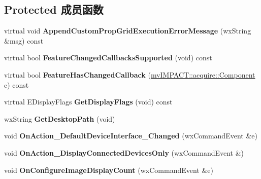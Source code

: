 \subsection*{Protected 成员函数}
\begin{DoxyCompactItemize}
\item 
\hypertarget{class_prop_view_frame_a87aa1f344d462e6770db16c2cde90939}{virtual void {\bfseries Append\+Custom\+Prop\+Grid\+Execution\+Error\+Message} (wx\+String \&msg) const }\label{class_prop_view_frame_a87aa1f344d462e6770db16c2cde90939}

\item 
\hypertarget{class_prop_view_frame_a57034c667d733512ce04baa935dfb9ba}{virtual bool {\bfseries Feature\+Changed\+Callbacks\+Supported} (void) const }\label{class_prop_view_frame_a57034c667d733512ce04baa935dfb9ba}

\item 
\hypertarget{class_prop_view_frame_a1a16a8fc6d2a0a8e7a744d9ebe54304b}{virtual bool {\bfseries Feature\+Has\+Changed\+Callback} (\hyperlink{classmv_i_m_p_a_c_t_1_1acquire_1_1_component}{mv\+I\+M\+P\+A\+C\+T\+::acquire\+::\+Component} c) const }\label{class_prop_view_frame_a1a16a8fc6d2a0a8e7a744d9ebe54304b}

\item 
\hypertarget{class_prop_view_frame_ac54e19c02e8c7582d0e13a2ec74f8ae5}{virtual E\+Display\+Flags {\bfseries Get\+Display\+Flags} (void) const }\label{class_prop_view_frame_ac54e19c02e8c7582d0e13a2ec74f8ae5}

\item 
\hypertarget{class_prop_view_frame_aba7ead9bd67c28168c4432c045a0a3ee}{wx\+String {\bfseries Get\+Desktop\+Path} (void)}\label{class_prop_view_frame_aba7ead9bd67c28168c4432c045a0a3ee}

\item 
\hypertarget{class_prop_view_frame_af32a0f56e9b3626492455110695dea24}{void {\bfseries On\+Action\+\_\+\+Default\+Device\+Interface\+\_\+\+Changed} (wx\+Command\+Event \&e)}\label{class_prop_view_frame_af32a0f56e9b3626492455110695dea24}

\item 
\hypertarget{class_prop_view_frame_ae1f7f0c31050ac780e07238080d206a1}{void {\bfseries On\+Action\+\_\+\+Display\+Connected\+Devices\+Only} (wx\+Command\+Event \&)}\label{class_prop_view_frame_ae1f7f0c31050ac780e07238080d206a1}

\item 
\hypertarget{class_prop_view_frame_abc581fdb9124877907fa6ceb39606572}{void {\bfseries On\+Configure\+Image\+Display\+Count} (wx\+Command\+Event \&e)}\label{class_prop_view_frame_abc581fdb9124877907fa6ceb39606572}


\end{DoxyCompactItemize}
